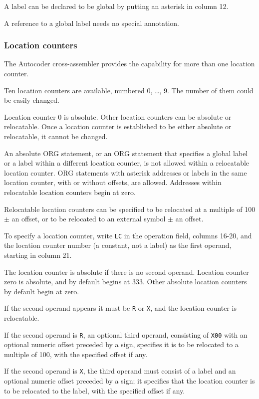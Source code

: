 \documentclass[12pt,twoside]{article}
\begin{document}
A label can be declared to be global by putting an asterisk in column 12.

A reference to a global label needs no special annotation.

\subsubsection{Location counters}\label{reloc}

The Autocoder cross-assembler provides the capability for more than one
location counter.

Ten location counters are available, numbered 0, \dots, 9.  The number
of them could be easily changed.

Location counter 0 is absolute.  Other location counters can be absolute
or relocatable.  Once a location counter is established to be either
absolute or relocatable, it cannot be changed.

An absolute ORG statement, or an ORG statement that specifies a global
label or a label within a different location counter, is not allowed
within a relocatable location counter.  ORG statements with asterisk
addresses or labels in the same location counter, with or without offsets,
are allowed.  Addresses within relocatable location counters begin at
zero.

Relocatable location counters can be specified to be relocated at a
multiple of 100 $\pm$ an offset, or to be relocated to an external symbol
$\pm$ an offset.

To specify a location counter, write {\tt LC} in the operation field,
columns 16-20, and the location counter number (a constant, not a label)
as the first operand, starting in column 21.

The location counter is absolute if there is no second operand.  Location
counter zero is absolute, and by default begins at 333.  Other absolute
location counters by default begin at zero.

If the second operand appears it must be {\tt R} or {\tt X}, and the
location counter is relocatable.

If the second operand is {\tt R}, an optional third operand, consisting of
{\tt X00} with an optional numeric offset preceded by a sign, specifies it
is to be relocated to a multiple of 100, with the specified offset if any.

If the second operand is {\tt X}, the third operand must consist of a
label and an optional numeric offset preceded by a sign; it specifies
that the location counter is to be relocated to the label, with the
specified offset if any.
\end{document}
